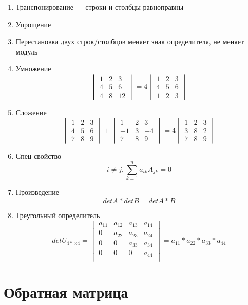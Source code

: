\documentclass{article}
\begin{document}
\begin{enumerate}
	\item Транспонирование --- строки и столбцы равноправны
	\item Упрощение
	\item Перестановка двух строк/столбцов меняет знак определителя, не меняет модуль
	\item Умножение
	\[
	\begin{vmatrix}
		1 & 2 & 3 \\
		4 & 5 & 6 \\
		4 & 8 & 12
	\end{vmatrix} =
	4 \begin{vmatrix}
		1 & 2 & 3 \\
		4 & 5 & 6 \\
		1 & 2 & 3
	\end{vmatrix}
	\]
	\item Сложение
	\[
	\begin{vmatrix}
		1 & 2 & 3 \\
		4 & 5 & 6 \\
		7 & 8 & 9
	\end{vmatrix} +
	\begin{vmatrix}
		1 & 2 & 3 \\
		-1 & 3 & -4 \\
		7 & 8 & 9
	\end{vmatrix} =
	4 \begin{vmatrix}
		1 & 2 & 3 \\
		3 & 8 & 2 \\
		7 & 8 & 9
	\end{vmatrix}
	\]
	\item Спец-свойство
	\[
	i \ne j, \sum_{k=1}^{n} a_{ik} A_{jk} = 0
	\]
	\item Произведение
	\[
	det A * det B = det A * B
	\]
	\item Треугольный определитель
	\[
	det U_{4*\times 4} =
	\begin{vmatrix}
		a_{11} & a_{12} & a_{13} & a_{14} \\
		0 & a_{22} & a_{23} & a_{24} \\
		0 & 0 & a_{33} & a_{34} \\
		0 & 0 & 0 & a_{44} \\
	\end{vmatrix} =
	a_{11} * a_{22} * a_{33} * a_{44}
	\]
\end{enumerate}

\section{Обратная матрица}
\end{document}
